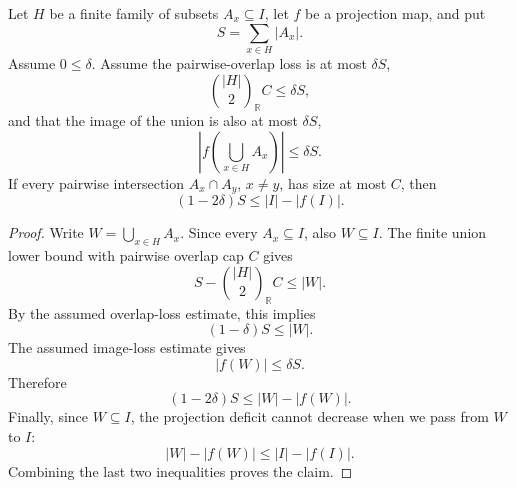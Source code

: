 \begin{helper}
Let \(H\) be a finite family of subsets \(A_x\subseteq I\), let \(f\) be a
projection map, and put
\[
S=\sum_{x\in H}|A_x|.
\]
Assume \(0\le\delta\).  Assume the pairwise-overlap loss is at most
\(\delta S\),
\[
\binom{|H|}{2}_{\mathbb R} C\le \delta S,
\]
and that the image of the union is also at most \(\delta S\),
\[
\left|f\!\left(\bigcup_{x\in H}A_x\right)\right|\le\delta S.
\]
If every pairwise intersection \(A_x\cap A_y\), \(x\ne y\), has size at most
\(C\), then
\[
(1-2\delta)S\le |I|-\left|f(I)\right|.
\]
\end{helper}
\begin{proof}
Write \(W=\bigcup_{x\in H}A_x\).  Since every \(A_x\subseteq I\), also
\(W\subseteq I\).  The finite union lower bound with pairwise overlap cap
\(C\) gives
\[
S-\binom{|H|}{2}_{\mathbb R}C\le |W|.
\]
By the assumed overlap-loss estimate, this implies
\[
(1-\delta)S\le |W|.
\]
The assumed image-loss estimate gives
\[
|f(W)|\le\delta S.
\]
Therefore
\[
(1-2\delta)S\le |W|-|f(W)|.
\]
Finally, since \(W\subseteq I\), the projection deficit cannot decrease when
we pass from \(W\) to \(I\):
\[
|W|-|f(W)|\le |I|-|f(I)|.
\]
Combining the last two inequalities proves the claim.
\end{proof}
